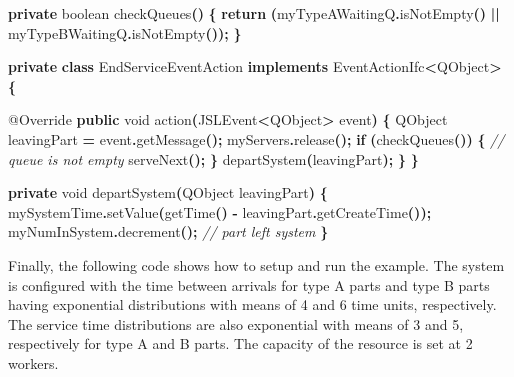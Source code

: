 \documentclass[
]{book}
\newenvironment{Shaded}{\begin{snugshade}}{\end{snugshade}}
\newcommand{\AttributeTok}[1]{\textcolor[rgb]{0.77,0.63,0.00}{#1}}
\newcommand{\CommentTok}[1]{\textcolor[rgb]{0.56,0.35,0.01}{\textit{#1}}}
\newcommand{\ControlFlowTok}[1]{\textcolor[rgb]{0.13,0.29,0.53}{\textbf{#1}}}
\newcommand{\DataTypeTok}[1]{\textcolor[rgb]{0.13,0.29,0.53}{#1}}
\newcommand{\FunctionTok}[1]{\textcolor[rgb]{0.00,0.00,0.00}{#1}}
\newcommand{\KeywordTok}[1]{\textcolor[rgb]{0.13,0.29,0.53}{\textbf{#1}}}
\newcommand{\NormalTok}[1]{#1}
\newcommand{\OperatorTok}[1]{\textcolor[rgb]{0.81,0.36,0.00}{\textbf{#1}}}
\theoremstyle{definition}
\theoremstyle{definition}
\theoremstyle{definition}
\theoremstyle{definition}
\theoremstyle{remark}
\begin{document}
\begin{Shaded}
\begin{Highlighting}[]
    \KeywordTok{private} \DataTypeTok{boolean} \FunctionTok{checkQueues}\OperatorTok{()} \OperatorTok{\{}
        \ControlFlowTok{return} \OperatorTok{(}\NormalTok{myTypeAWaitingQ}\OperatorTok{.}\FunctionTok{isNotEmpty}\OperatorTok{()} \OperatorTok{||}\NormalTok{ myTypeBWaitingQ}\OperatorTok{.}\FunctionTok{isNotEmpty}\OperatorTok{());}
    \OperatorTok{\}}

    \KeywordTok{private} \KeywordTok{class}\NormalTok{ EndServiceEventAction }\KeywordTok{implements}\NormalTok{ EventActionIfc}\OperatorTok{\textless{}}\NormalTok{QObject}\OperatorTok{\textgreater{}} \OperatorTok{\{}

        \AttributeTok{@Override}
        \KeywordTok{public} \DataTypeTok{void} \FunctionTok{action}\OperatorTok{(}\NormalTok{JSLEvent}\OperatorTok{\textless{}}\NormalTok{QObject}\OperatorTok{\textgreater{}}\NormalTok{ event}\OperatorTok{)} \OperatorTok{\{}
\NormalTok{            QObject leavingPart }\OperatorTok{=}\NormalTok{ event}\OperatorTok{.}\FunctionTok{getMessage}\OperatorTok{();}
\NormalTok{            myServers}\OperatorTok{.}\FunctionTok{release}\OperatorTok{();}
            \ControlFlowTok{if} \OperatorTok{(}\FunctionTok{checkQueues}\OperatorTok{())} \OperatorTok{\{} \CommentTok{// queue is not empty}
                \FunctionTok{serveNext}\OperatorTok{();}
            \OperatorTok{\}}
            \FunctionTok{departSystem}\OperatorTok{(}\NormalTok{leavingPart}\OperatorTok{);}
        \OperatorTok{\}}
    \OperatorTok{\}}

    \KeywordTok{private} \DataTypeTok{void} \FunctionTok{departSystem}\OperatorTok{(}\NormalTok{QObject leavingPart}\OperatorTok{)} \OperatorTok{\{}
\NormalTok{        mySystemTime}\OperatorTok{.}\FunctionTok{setValue}\OperatorTok{(}\FunctionTok{getTime}\OperatorTok{()} \OperatorTok{{-}}\NormalTok{ leavingPart}\OperatorTok{.}\FunctionTok{getCreateTime}\OperatorTok{());}
\NormalTok{        myNumInSystem}\OperatorTok{.}\FunctionTok{decrement}\OperatorTok{();} \CommentTok{// part left system      }
    \OperatorTok{\}}
\end{Highlighting}
\end{Shaded}

Finally, the following code shows how to setup and run the example. The system is configured with the time between arrivals for type A parts and type B parts having exponential distributions with
means of 4 and 6 time units, respectively. The service time
distributions are also exponential with means of 3 and 5, respectively
for type A and B parts. The capacity of the resource is set at 2
workers.
\end{document}
